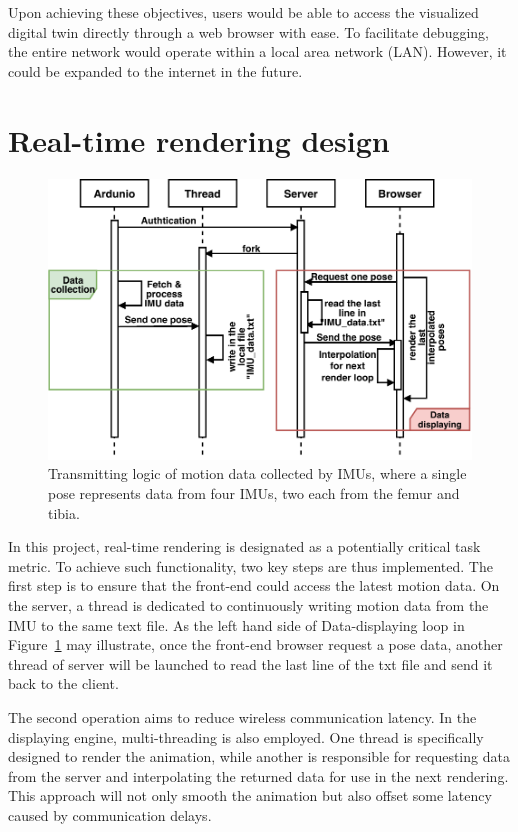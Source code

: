 Upon achieving these objectives, users would be able to access the visualized digital twin directly through a web browser with ease.
To facilitate debugging, the entire network would operate within a local area network (LAN). However, it could be expanded to the internet in the future.

\section{Real-time rendering design}
\begin{figure}[htbp]
	\centering
	\includegraphics[clip, trim=0cm 0cm 0cm 0cm, width=\textwidth]{
		fileForWriting/sequence}
	\caption[Transmitting logic of motion data]{Transmitting logic of motion data collected by IMUs, where a single pose represents data from four IMUs, two each from the femur and tibia.}
	\label{fig:sequence}
\end{figure}
In this project, real-time rendering is designated as a potentially critical task metric.
To achieve such functionality, two key steps are thus implemented.
The first step is to ensure that the front-end could access the latest motion data.
On the server, a thread is dedicated to continuously writing motion data from the IMU to the same text file.
As the left hand side of Data-displaying loop in Figure~\ref{fig:sequence} may illustrate, once the front-end browser request a pose data, another thread of server will be launched to read the last line of the txt file and send it back to the client.

The second operation aims to reduce wireless communication latency.
In the displaying engine, multi-threading is also employed.
One thread is specifically designed to render the animation, while another is responsible for requesting data from the server and interpolating the returned data for use in the next rendering.
This approach will not only smooth the animation but also offset some latency caused by communication delays.

